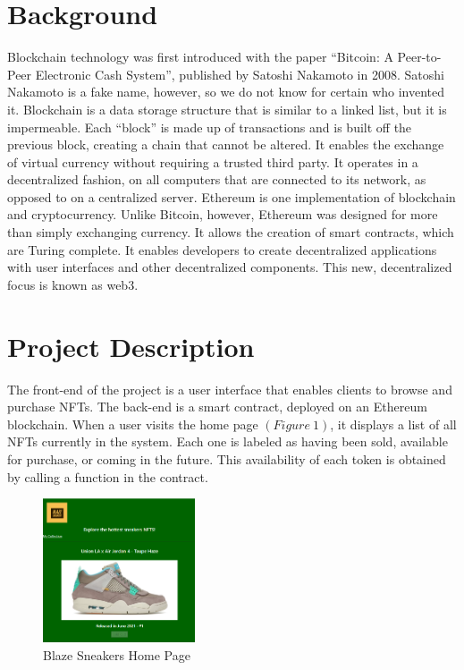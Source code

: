 \documentclass{article}
\begin{document}
\section{Background}
    Blockchain technology was first introduced with the paper ``Bitcoin: A Peer-to-Peer Electronic Cash System'', 
    published by Satoshi Nakamoto in 2008.
    Satoshi Nakamoto is a fake name, however, so we do not know for certain who invented it.
    Blockchain is a data storage structure that is similar to a linked list, but it is impermeable.
    Each ``block'' is made up of transactions and is built off the previous block, creating a chain that cannot be altered.
    It enables the exchange of virtual currency without requiring a trusted third party.
    It operates in a decentralized fashion, on all computers that are connected to its network, 
    as opposed to on a centralized server.
    \newline
    \indent
    Ethereum is one implementation of blockchain and cryptocurrency.
    Unlike Bitcoin, however, Ethereum was designed for more than simply exchanging currency. 
    It allows the creation of smart contracts, which are Turing complete. 
    It enables developers to create decentralized applications with user interfaces and other decentralized components.
    This new, decentralized focus is known as web3.

\section{Project Description}
    The front-end of the project is a user interface that enables clients to browse and purchase NFTs.
    The back-end is a smart contract, deployed on an Ethereum blockchain.
    When a user visits the home page $( Figure~1 )$, it displays a list of all NFTs currently in the system. 
    Each one is labeled as having been sold, available for purchase, or coming in the future.
    This availability of each token is obtained by calling a function in the contract.
    
\begin{figure}[!h]
    \centering
    \includegraphics[width=0.4\textwidth]{HomePage.png}
    \caption{Blaze Sneakers Home Page}
\end{figure}
    
\end{document}
